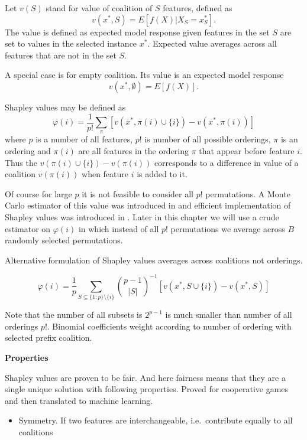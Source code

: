 \documentclass[12pt,]{krantz}
\providecommand{\tightlist}{%
  \setlength{\itemsep}{0pt}\setlength{\parskip}{0pt}}
\theoremstyle{definition}
\theoremstyle{definition}
\theoremstyle{definition}
\theoremstyle{remark}
\begin{document}
Let \(v(S)\) stand for value of coalition of \(S\) features, defined as
\[
v(x^*, S) = E[f(X) | X_S = x^*_S].
\] The value is defined as expected model response given features in the
set \(S\) are set to values in the selected instance \(x^*\). Expected
value averages across all features that are not in the set \(S\).

A special case is for empty coalition. Its value is an expected model
response \[
v(x^*, \emptyset) = E[f(X)].
\]

Shapley values may be defined as \[
\varphi(i) = \frac{1}{p!} \sum_{\pi} [v(x^*, \pi(i) \cup \{i\}) - v(x^*, \pi(i))]  
\] where \(p\) is a number of all features, \(p!\) is number of all
possible orderings, \(\pi\) is an ordering and \(\pi(i)\) are all
features in the ordering \(\pi\) that appear before feature \(i\). Thus
the \(v(\pi(i) \cup \{i\}) - v(\pi(i))\) corresponds to a difference in
value of a coalition \(v(\pi(i))\) when feature \(i\) is added to it.

Of course for large \(p\) it is not feasible to consider all \(p!\)
permutations. A Monte Carlo estimator of this value was introduced in
\citep{Strumbelj2014} and efficient implementation of Shapley values was
introduced in \citep{SHAP}. Later in this chapter we will use a crude
estimator on \(\varphi(i)\) in which instead of all \(p!\) permutations
we average across \(B\) randomly selected permutations.

Alternative formulation of Shapley values averages across coalitions not
orderings.

\[
\varphi(i) = \frac 1{p}\sum_{S \subseteq \{1:p\}\setminus \{i\}}  {{p-1}\choose{|S|}}^{-1} \left[ v(x^*, S \cup \{i\}) - v (x^*, S) \right]
\]

Note that the number of all subsets is \(2^{p-1}\) is much smaller than
number of all orderings \(p!\). Binomial coefficients weight according
to number of ordering with selected prefix coalition.

\textbf{Properties}

Shapley values are proven to be fair. And here fairness means that they
are a single unique solution with following properties. Proved for
cooperative games and then translated to machine learning.

\begin{itemize}
\tightlist
\item
  Symmetry. If two features are interchangeable, i.e.~contribute equally
  to all coalitions
\end{itemize}
\end{document}
